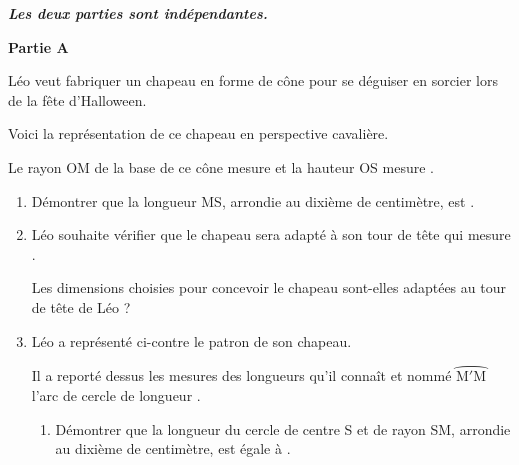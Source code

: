 \documentclass[11pt]{article}
\begin{document}
\textbf{\emph{Les deux parties sont indépendantes.}}

\medskip

\textbf{Partie A}

\begin{minipage}{0.6\linewidth}
Léo veut fabriquer un chapeau en forme de cône pour se déguiser en sorcier lors de la fête d'Halloween.

\smallskip

Voici la représentation de ce chapeau en perspective cavalière.

\smallskip

Le rayon OM de la base de ce cône mesure  et la hauteur OS mesure .

\end{minipage}
\hfill
{}

\begin{enumerate}
\item Démontrer que la longueur MS, arrondie au dixième de centimètre, est .
\item Léo souhaite vérifier que le chapeau sera adapté à son tour de tête qui mesure .

Les dimensions choisies pour concevoir le chapeau sont-elles adaptées au tour de tête de Léo ?

	\item \begin{minipage}[t]{0.48\linewidth}
		Léo a représenté ci-contre le patron de son chapeau.

		Il a reporté dessus les mesures des longueurs qu'il connaît et nommé $\wideparen{\mathrm{M}'\mathrm{M}}$ l'arc de cercle de longueur .

		\begin{enumerate}
			\item Démontrer que la longueur du cercle de centre S et de rayon SM, arrondie au dixième de centimètre, est égale à .
		\end{enumerate}
	\end{minipage}\hfill
{}
\end{enumerate}
\end{document}
